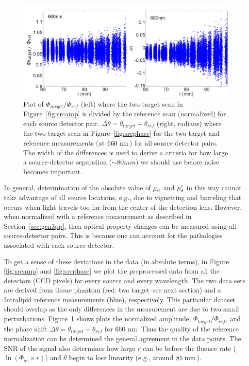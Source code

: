 \begin{figure}[t]
\centering
\includegraphics[width=14.5cm]{./figures/4_Gen3/dPhidphase.png}
\caption[Difference data of $\Phi$ and $\theta$]{Plot of $\Phi_{target}/\Phi_{ref}$ (left) where the two target scan in Figure~\ref{fig:srcamp} is divided by the reference scan (normalized) for each source detector pair. $\Delta\theta=\theta_{target}-\theta_{ref}$ (right, radians) where the two target scan in Figure~\ref{fig:srcphase} for the two target and reference measurements (at $660~\rm{nm}$) for all source detector pairs. The width of the differences is used to derive a criteria for how large a source-detector separation ($\sim80mm$) we should use before noise becomes important.}
\label{fig:dPhidphase}
\end{figure}
\floatbarrier

In general, determination of the absolute value of $\mu_a$ and $\mu_s^{\prime}$ in this way cannot take advantage of all source locations, e.g., due to vignetting and barreling that occurs when light travels too far from the center of the detection lens. However, when normalized with a reference measurement as described in Section~\ref{sec:gen3pp}, then optical property changes can be measured using all source-detector pairs. This is because one can account for the pathologies associated with each source-detector. 

To get a sense of these deviations in the data (in absolute terms), in Figure \ref{fig:srcamp} and \ref{fig:srcphase} we plot the preprocessed data from all the detectors (CCD pixels) for every source and every wavelength. The two data sets are derived from tissue phantom (red: two target--see next section) and a Intralipid reference measurements (blue), respectively. This particular dataset should overlap as the only differences in the measurement are due to two small perturbations. Figure~\ref{fig:dPhidphase} shows plots the normalized amplitude, $\Phi_{target}/\Phi_{ref}$, and the phase shift $\Delta\theta =\theta_{target}-\theta_{ref}$ for $660$ nm. Thus the quality of the reference normalization can be determined the general agreement in the data points. The SNR of the signal also determines how large $r$ can be before the fluence rate ($\ln (\Phi_{ac}\times r)$) and $\theta$ begin to lose linearity (e.g., around $85~\rm{mm}$).
\floatbarrier
